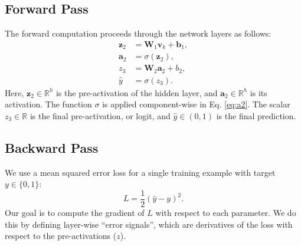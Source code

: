 \documentclass[%
  reprint,
  superscriptaddress,
  showpacs,
  showkeys,
  amsmath,amssymb,
  pra,
  longbibliography,
  floatfix,
  x11names
]{revtex4-2}
\begin{document}
\subsection{Forward Pass}
The forward computation proceeds through the network layers as follows:
\begin{align}
\bm{z}_2 &= \bm{W}_1 \bm{v}_k + \bm{b}_1, \label{eq:z2}\\
\bm{a}_2 &= \sigma(\bm{z}_2), \label{eq:a2}\\
z_3 &= \bm{W}_2 \bm{a}_2 + b_2, \label{eq:z3}\\
\hat{y} &= \sigma(z_3). \label{eq:yhat}
\end{align}
Here, $\bm{z}_2 \in \mathbb{R}^h$ is the pre-activation of the hidden layer, and $\bm{a}_2 \in \mathbb{R}^h$ is its activation. The function $\sigma$ is applied component-wise in Eq. \eqref{eq:a2}. The scalar $z_3 \in \mathbb{R}$ is the final pre-activation, or logit, and $\hat{y} \in (0,1)$ is the final prediction.

\subsection{Backward Pass}
We use a mean squared error loss for a single training example with target $y \in \{0, 1\}$:
\begin{equation}
L = \frac{1}{2}(\hat{y}-y)^2.
\end{equation}
Our goal is to compute the gradient of $L$ with respect to each parameter. We do this by defining layer-wise ``error signals'', which are derivatives of the loss with respect to the pre-activations ($z$).
\end{document}
